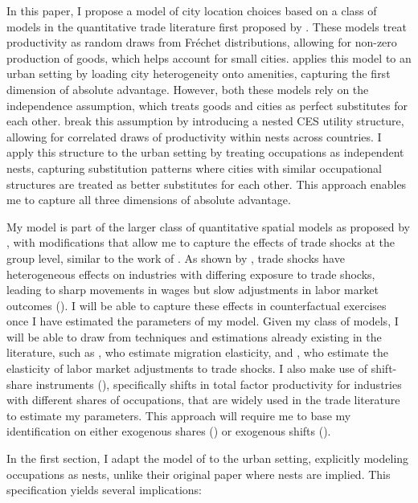 \documentclass[10pt]{article}
\begin{document}
In this paper, I propose a model of city location choices based on a class of models in the quantitative trade literature first proposed by \cite{ek}. These models treat productivity as random draws from Fr\'{e}chet distributions, allowing for non-zero production of goods, which helps account for small cities. \cite{redding} applies this model to an urban setting by loading city heterogeneity onto amenities, capturing the first dimension of absolute advantage. However, both these models rely on the independence assumption, which treats goods and cities as perfect substitutes for each other. \cite{lindandramondo} break this assumption by introducing a nested CES utility structure, allowing for correlated draws of productivity within nests across countries. I apply this structure to the urban setting by treating occupations as independent nests, capturing substitution patterns where cities with similar occupational structures are treated as better substitutes for each other. This approach enables me to capture all three dimensions of absolute advantage.

My model is part of the larger class of quantitative spatial models as proposed by \cite{redding2017}, with modifications that allow me to capture the effects of trade shocks at the group level, similar to the work of \cite{galle2023}. As shown by \cite{adh2013}, trade shocks have heterogeneous effects on industries with differing exposure to trade shocks, leading to sharp movements in wages but slow adjustments in labor market outcomes (\cite{acm2010}). I will be able to capture these effects in counterfactual exercises once I have estimated the parameters of my model. Given my class of models, I will be able to draw from techniques and estimations already existing in the literature, such as \cite{albert_monras2022}, who estimate migration elasticity, and \cite{kim_vogel2020}, who estimate the elasticity of labor market adjustments to trade shocks. I also make use of shift-share instruments (\cite{bartik1991}), specifically shifts in total factor productivity for industries with different shares of occupations, that are widely used in the trade literature to estimate my parameters. This approach will require me to base my identification on either exogenous shares (\cite{pssh2020}) or exogenous shifts (\cite{bhj2020}).

In the first section, I adapt the model of \cite{lindandramondo} to the urban setting, explicitly modeling occupations as nests, unlike their original paper where nests are implied. This specification yields several implications:
\end{document}
